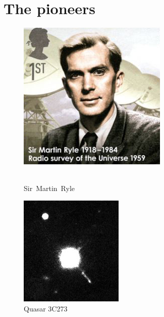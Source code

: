 \section{The pioneers}
\label{sec:pioneers}
\begin{figure}

    \begin{flushright}    
    \includegraphics[scale= 0.45]{Figures/Sir-Martin-Ryle-C}
 	\caption[Sir Martin Ryle]{\\Sir~Martin~Ryle{\footnotemark}}
	\label{fig:Martin}    

    \includegraphics[scale= 0.45]{Figures/Quasar3C273}
 	\caption[Quasar 3C273]{Quasar 3C273~\cite{britannica.Quasar}}
	\label{fig:Quasar}
	\end{flushright}
\end{figure}
\enlargethispage{\baselineskip} 
